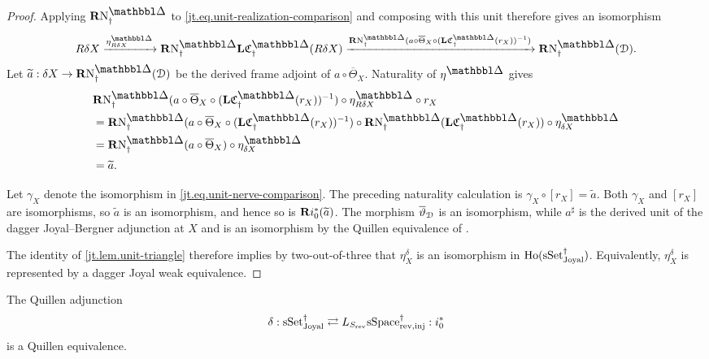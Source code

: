 \documentclass[a4paper,dvipdfmx,11pt]{amsart}
\begin{document}
\begin{proof}
  Applying $\bfR\N^{\prism}_{\dag}$ to \eqref{jt.eq.unit-realization-comparison} and composing with this unit therefore gives an isomorphism
  \begin{align}\label{jt.eq.unit-nerve-comparison}
    R\delta X
    \xrightarrow{\eta^{\prism}_{R\delta X}}
    \bfR\N^{\prism}_{\dag}
    \bfL\frakC^{\prism}_{\dag}(R\delta X) 
    \xrightarrow{\bfR\N^{\prism}_{\dag}(a \circ \overline\Theta_X \circ (\bfL\frakC^{\prism}_{\dag}(r_X))^{-1})}
    \bfR\N^{\prism}_{\dag}(\calD).
  \end{align}
  Let $\widetilde a: \delta X \to \bfR\N^{\prism}_{\dag}(\calD)$ be the derived frame adjoint of $a\circ\overline\Theta_X$.
  Naturality of $\eta^{\prism}$ gives
  \begin{align}
    &\bfR\N^{\prism}_{\dag}(a \circ \overline\Theta_X \circ (\bfL\frakC^{\prism}_{\dag}(r_X))^{-1}) \circ \eta^{\prism}_{R\delta X} \circ r_X \\
    &=
    \bfR\N^{\prism}_{\dag}(a \circ \overline\Theta_X \circ (\bfL\frakC^{\prism}_{\dag}(r_X))^{-1}) \circ \bfR\N^{\prism}_{\dag} (\bfL\frakC^{\prism}_{\dag}(r_X)) \circ \eta^{\prism}_{\delta X} \\
    &=
    \bfR\N^{\prism}_{\dag}(a \circ \overline\Theta_X) \circ \eta^{\prism}_{\delta X} \\
    &= 
    \widetilde a.
  \end{align}

  Let $\gamma_X$ denote the isomorphism in \eqref{jt.eq.unit-nerve-comparison}.
  The preceding naturality calculation is $\gamma_X \circ [r_X] = \widetilde a$.
  Both $\gamma_X$ and $[r_X]$ are isomorphisms, so $\widetilde a$ is an isomorphism, and hence so is $\mathbf{R} i_0^*(\widetilde a)$.
  The morphism $\overline\vartheta_{\mathcal{D}}$ is an isomorphism, while $a^{\sharp}$ is the derived unit of the dagger Joyal--Bergner adjunction at $X$ and is an isomorphism by the Quillen equivalence of \cite[Theorem~3.5.6]{Aka26}.

  The identity of \cref{jt.lem.unit-triangle} therefore implies by two-out-of-three that $\eta_X^{\delta}$ is an isomorphism in $\mathrm{Ho}(\mathrm{sSet}^{\dag}_{\mathrm{Joyal}})$.
  Equivalently, $\eta_X^{\delta}$ is represented by a dagger Joyal weak equivalence.
\end{proof}

\begin{theorem}\label{jt.thm.main}
  The Quillen adjunction
  \begin{align}
    \delta:
    \mathrm{sSet}^{\dag}_{\mathrm{Joyal}}
    \rightleftarrows
    L_{S_{\mathrm{rev}}}\mathrm{sSpace}^{\dag}_{\mathrm{rev},\mathrm{inj}}
    :i_{0}^{*}
  \end{align}
  is a Quillen equivalence.
\end{theorem}
\end{document}

